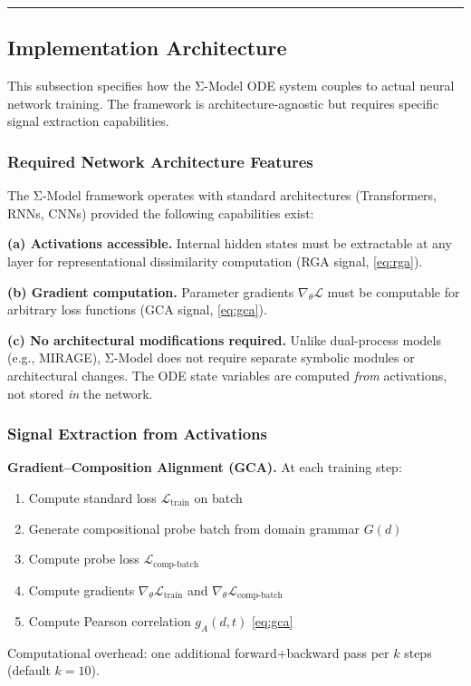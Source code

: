 \noindent\rule{\linewidth}{0.4pt}

\subsection{Implementation Architecture}\label{sec:implementation}

This subsection specifies how the Σ-Model ODE system couples to actual
neural network training. The framework is architecture-agnostic but
requires specific signal extraction capabilities.

\subsubsection{Required Network Architecture Features}

The Σ-Model framework operates with standard architectures (Transformers,
RNNs, CNNs) provided the following capabilities exist:

\textbf{(a) Activations accessible.} Internal hidden states must be
extractable at any layer for representational dissimilarity computation
(RGA signal, \eqref{eq:rga}).

\textbf{(b) Gradient computation.} Parameter gradients $\nabla_\theta
\mathcal{L}$ must be computable for arbitrary loss functions (GCA signal,
\eqref{eq:gca}).

\textbf{(c) No architectural modifications required.} Unlike dual-process
models (e.g., MIRAGE), Σ-Model does not require separate symbolic modules
or architectural changes. The ODE state variables are computed \textit{from}
activations, not stored \textit{in} the network.

\subsubsection{Signal Extraction from Activations}

\textbf{Gradient--Composition Alignment (GCA).} At each training step:
\begin{enumerate}[nosep]
\item Compute standard loss $\mathcal{L}_{\text{train}}$ on batch
\item Generate compositional probe batch from domain grammar $G(d)$
\item Compute probe loss $\mathcal{L}_{\text{comp-batch}}$
\item Compute gradients $\nabla_\theta \mathcal{L}_{\text{train}}$ and $\nabla_\theta \mathcal{L}_{\text{comp-batch}}$
\item Compute Pearson correlation $g_A(d,t)$ \eqref{eq:gca}
\end{enumerate}
Computational overhead: one additional forward+backward pass per $k$ steps
(default $k=10$).

